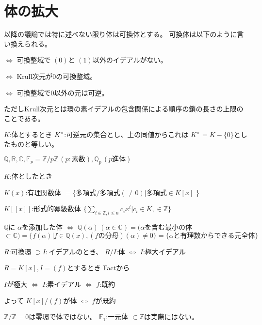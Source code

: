\documentclass[../master_galois_theory]{subfiles}
\begin{document}
\setcounter{section}{0}

\section{体の拡大}

以降の議論では特に述べない限り体は可換体とする。
可換体は以下のように言い換えられる。

$\Leftrightarrow$ 可換整域で $(0)$と $(1)$以外のイデアルがない。

$\Leftrightarrow$ Krull次元が0の可換整域。

$\Leftrightarrow$ 可換整域で0以外の元は可逆。

ただしKrull次元とは環の素イデアルの包含関係による順序の鎖の長さの上限のことである。

$K$:体とするとき $K^\times$:可逆元の集合とし、上の同値からこれは $K^\times = K - \{ 0 \}$としたものと等しい。

\begin{exam}
  $\mathbb{Q}, \mathbb{R}, \mathbb{C}, \mathbb{F}_p = \mathbb{Z}/p\mathbb{Z} \, (p:素数), \mathbb{Q}_p \, (p進体)$
\end{exam}

\begin{exam}
  $K$;体としたとき

  $K(x)$:有理関数体 $= \{ 多項式 / 多項式(\neq 0) | 多項式 \in K[x]$ \}

  $K[[x]]$:形式的冪級数体 $\{ \sum_{i \in \mathbb{Z} , i \leq n} c_i x^i | c_i \in K , \in \mathbb{Z} \}$

  $\mathbb{Q}$に $\alpha$を添加した体 $\Leftrightarrow$
  $\mathbb{Q}(\alpha) \, (\alpha \in \mathbb{C})
  = (\alpha$を含む最小の体 $\subset \mathbb{C})
  = \{ f(\alpha) | f \in \mathbb{Q}(x) , (fの分母)(\alpha) \neq 0 \}
  = \{ \alpha と有理数からできる元全体 \}$
\end{exam}

\begin{fact}
  $R$:可換環 $\supset I : イデアル$のとき、
  $R/I$:体 $\Leftrightarrow$ $I$:極大イデアル
\end{fact}

\begin{exam}
  $R = K[x] , I = (f)$とするとき Factから

  $I$が極大 $\Leftrightarrow$ $I$:素イデアル $\Leftrightarrow$ $f$:既約

  よって $K[x]/(f)$が体 $\Leftrightarrow$ $f$が既約
\end{exam}

\begin{rem}
  $\mathbb{Z}/\mathbb{Z} = 0$は零環で体ではない。
  $\mathbb{F}_1$:一元体 $\subset \mathbb{Z}$は実際にはない。
\end{rem}
\end{document}
